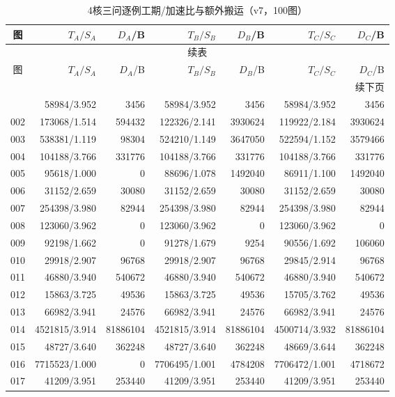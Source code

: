 \begin{longtable}{crrrrrr}
\caption{4核三问逐例工期/加速比与额外搬运（v7，100图）}\label{tab:detail-4}\\
\toprule
图 & $T_A/S_A$ & $D_A$/B & $T_B/S_B$ & $D_B$/B & $T_C/S_C$ & $D_C$/B \\
\midrule
\endfirsthead
\multicolumn{7}{c}{续表}\\
\toprule
图 & $T_A/S_A$ & $D_A$/B & $T_B/S_B$ & $D_B$/B & $T_C/S_C$ & $D_C$/B \\
\midrule
\endhead
\midrule\multicolumn{7}{r}{续下页}\\
\endfoot
\bottomrule
\endlastfoot
001 & 58984/3.952 & 3456 & 58984/3.952 & 3456 & 58984/3.952 & 3456 \\
002 & 173068/1.514 & 594432 & 122326/2.141 & 3930624 & 119922/2.184 & 3930624 \\
003 & 538381/1.119 & 98304 & 524210/1.149 & 3647050 & 522594/1.152 & 3579466 \\
004 & 104188/3.766 & 331776 & 104188/3.766 & 331776 & 104188/3.766 & 331776 \\
005 & 95618/1.000 & 0 & 88696/1.078 & 1492040 & 86911/1.100 & 1492040 \\
006 & 31152/2.659 & 30080 & 31152/2.659 & 30080 & 31152/2.659 & 30080 \\
007 & 254398/3.980 & 82944 & 254398/3.980 & 82944 & 254398/3.980 & 82944 \\
008 & 123060/3.962 & 0 & 123060/3.962 & 0 & 123060/3.962 & 0 \\
009 & 92198/1.662 & 0 & 91278/1.679 & 9254 & 90556/1.692 & 106060 \\
010 & 29918/2.907 & 96768 & 29918/2.907 & 96768 & 29845/2.914 & 96768 \\
011 & 46880/3.940 & 540672 & 46880/3.940 & 540672 & 46880/3.940 & 540672 \\
012 & 15863/3.725 & 49536 & 15863/3.725 & 49536 & 15705/3.762 & 49536 \\
013 & 66982/3.941 & 24576 & 66982/3.941 & 24576 & 66982/3.941 & 24576 \\
014 & 4521815/3.914 & 81886104 & 4521815/3.914 & 81886104 & 4500714/3.932 & 81886104 \\
015 & 48727/3.640 & 362248 & 48727/3.640 & 362248 & 48669/3.644 & 362248 \\
016 & 7715523/1.000 & 0 & 7706495/1.001 & 4784208 & 7706472/1.001 & 4718672 \\
017 & 41209/3.951 & 253440 & 41209/3.951 & 253440 & 41209/3.951 & 253440 \\

\end{longtable}

